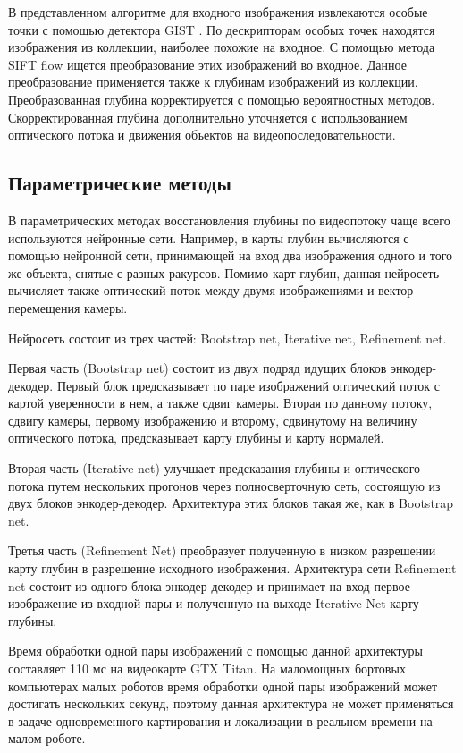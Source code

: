 \documentclass{mipt-thesis-bs}
\begin{document}
В представленном алгоритме для входного изображения извлекаются особые точки с помощью детектора GIST \cite{oliva2001modeling}. По дескрипторам особых точек находятся изображения из коллекции, наиболее похожие на входное. С помощью метода SIFT flow \cite{liu2010sift} ищется преобразование этих изображений во входное. Данное преобразование применяется также к глубинам изображений из коллекции. Преобразованная глубина корректируется с помощью вероятностных методов. Скорректированная глубина дополнительно уточняется с использованием оптического потока и движения объектов на видеопоследовательности.\\

\subsection{Параметрические методы}
В параметрических методах восстановления глубины по видеопотоку чаще всего используются нейронные сети. Например, в \cite{ummenhofer2017demon} карты глубин вычисляются с помощью нейронной сети, принимающей на вход два изображения одного и того же объекта, снятые с разных ракурсов. Помимо карт глубин, данная нейросеть вычисляет также оптический поток между двумя изображениями и вектор перемещения камеры.

Нейросеть состоит из трех частей: Bootstrap net, Iterative net, Refinement net.

Первая часть (Bootstrap net) состоит из двух подряд идущих блоков энкодер-декодер. Первый блок предсказывает по паре изображений оптический поток с картой уверенности в нем, а также сдвиг камеры. Вторая по данному потоку, сдвигу камеры, первому изображению и второму, сдвинутому на величину оптического потока, предсказывает карту глубины и карту нормалей.

Вторая часть (Iterative net) улучшает предсказания глубины и оптического потока путем нескольких прогонов через полносверточную сеть, состоящую из двух блоков энкодер-декодер. Архитектура этих блоков такая же, как в Bootstrap net.

Третья часть (Refinement Net) преобразует полученную в низком разрешении карту глубин в разрешение исходного изображения. Архитектура сети Refinement net состоит из одного блока энкодер-декодер и принимает на вход первое изображение из входной пары и полученную на выходе Iterative Net карту глубины.

Время обработки одной пары изображений с помощью данной архитектуры составляет 110 мс на видеокарте GTX Titan. На маломощных бортовых компьютерах малых роботов время обработки одной пары изображений может достигать нескольких секунд, поэтому данная архитектура не может применяться в задаче одновременного картирования и локализации в реальном времени на малом роботе.
\end{document}
